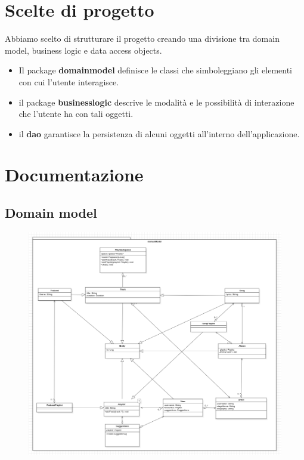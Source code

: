 \documentclass{article}
\begin{document}
\newpage
\section{Scelte di progetto}

Abbiamo scelto di strutturare il progetto creando una divisione tra domain model, business logic e data
access objects.
\begin{itemize}
  \item
    Il package  \textbf{domainmodel} definisce le classi che simboleggiano gli elementi con cui l'utente
    interagisce.
  \item
    il package \textbf{businesslogic} descrive le modalità e le possibilità di interazione che l'utente
    ha con tali oggetti.
  \item
    il \textbf{dao} garantisce la persistenza di alcuni oggetti all'interno dell'applicazione.

   \end{itemize}
    
\section{Documentazione}
   
\subsection{Domain model}

\begin{figure}[H]
\includegraphics[scale=0.4]{model01}
\end{figure}
\end{document}
